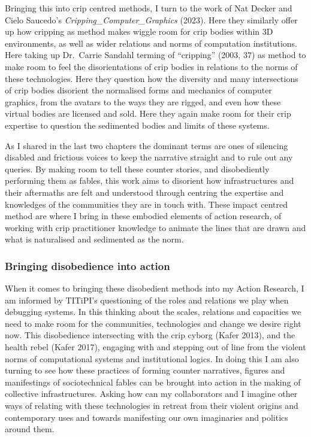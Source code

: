 Bringing this into crip centred methods, I turn to the work of Nat
Decker and Cielo Saucedo's \emph{Cripping\_Computer\_Graphics} (2023).
Here they similarly offer up how cripping as method makes wiggle room
for crip bodies within 3D environments, as well as wider relations and
norms of computation institutions. Here taking up Dr.~Carrie Sandahl
terming of ``cripping'' (2003, 37) as method to make room to feel the
disorientations of crip bodies in relations to the norms of these
technologies. Here they question how the diversity and many
intersections of crip bodies disorient the normalised forms and
mechanics of computer graphics, from the avatars to the ways they are
rigged, and even how these virtual bodies are licensed and sold. Here
they again make room for their crip expertise to question the sedimented
bodies and limits of these systems.

As I shared in the last two chapters the dominant terms are ones of
silencing disabled and frictious voices to keep the narrative straight
and to rule out any queries. By making room to tell these counter
stories, and disobediently performing them as fables, this work aims to
disorient how infrastructures and their aftermaths are felt and
understood through centring the expertise and knowledges of the
communities they are in touch with. These impact centred method are
where I bring in these embodied elements of action research, of working
with crip practitioner knowledge to animate the lines that are drawn and
what is naturalised and sedimented as the norm.

\hypertarget{bringing-disobedience-into-action}{%
\subsubsection[Bringing disobedience into
action]{\texorpdfstring{\protect\hypertarget{anchor}{}{}Bringing
disobedience into
action}{Bringing disobedience into action}}\label{bringing-disobedience-into-action}}

When it comes to bringing these disobedient methods into my Action
Research, I am informed by TITiPI's questioning of the roles and
relations we play when debugging systems. In this thinking about the
scales, relations and capacities we need to make room for the
communities, technologies and change we desire right now. This
disobedience intersecting with the crip cyborg (Kafer 2013), and the
health rebel (Kafer 2017), engaging with and stepping out of line from
the violent norms of computational systems and institutional logics. In
doing this I am also turning to see how these practices of forming
counter narratives, figures and manifestings of sociotechnical fables
can be brought into action in the making of collective infrastructures.
Asking how can my collaborators and I imagine other ways of relating
with these technologies in retreat from their violent origins and
contemporary uses and towards manifesting our own imaginaries and
politics around them.

